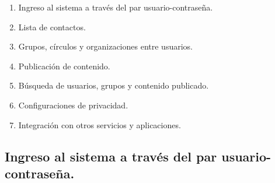 \begin{enumerate}
    \item{Ingreso al sistema a través del par usuario-contraseña.}
    \item{Lista de contactos.}
    \item{Grupos, círculos y organizaciones entre usuarios.}
    \item{Publicación de contenido.}
    \item{Búsqueda de usuarios, grupos y contenido publicado.}
    \item{Configuraciones de privacidad.}
    \item{Integración con otros servicios y aplicaciones.}


\end{enumerate}
\subsection{Ingreso al sistema a través del par usuario-contraseña.}
\label{sec:login}

